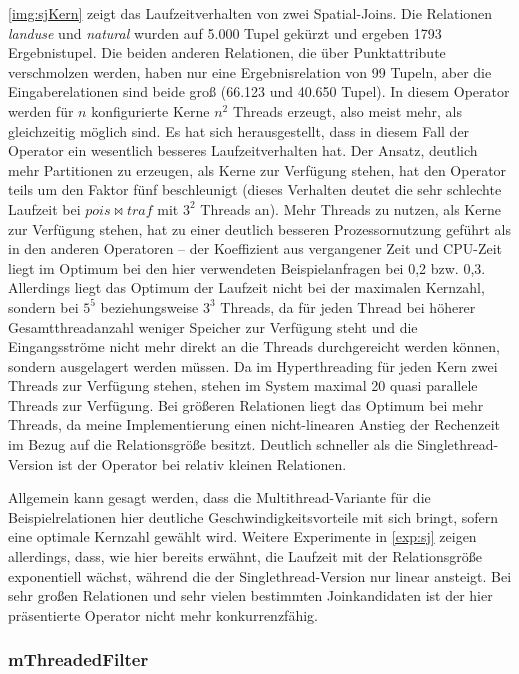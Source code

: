 \documentclass[a4paper,12pt,twoside]{article}
\newcommand{\Fb}[1]{\textit{#1}} %
\begin{document}
\autoref{img:sjKern} zeigt das Laufzeitverhalten von zwei Spatial-Joins. Die Relationen \Fb{landuse} und \Fb{natural} wurden auf 5.000 Tupel gekürzt und ergeben 1793 Ergebnistupel. Die beiden anderen Relationen, die über Punktattribute verschmolzen werden, haben nur eine Ergebnisrelation von 99 Tupeln, aber die Eingaberelationen sind beide groß (66.123 und 40.650 Tupel). In diesem Operator werden für $n$ konfigurierte Kerne $n^2$ Threads erzeugt, also meist mehr, als gleichzeitig möglich sind. Es hat sich herausgestellt, dass in diesem Fall der Operator ein wesentlich besseres Laufzeitverhalten hat. Der Ansatz, deutlich mehr Partitionen zu erzeugen, als Kerne zur Verfügung stehen, hat den Operator teils um den Faktor fünf beschleunigt (dieses Verhalten deutet die sehr schlechte Laufzeit bei $pois \bowtie traf$ mit $3^2$ Threads an). Mehr Threads zu nutzen, als Kerne zur Verfügung stehen, hat zu einer deutlich besseren Prozessornutzung geführt als in den anderen Operatoren -- der Koeffizient aus vergangener Zeit und CPU-Zeit liegt im Optimum bei den hier verwendeten Beispielanfragen bei 0,2 bzw. 0,3. Allerdings liegt das Optimum der Laufzeit nicht bei der maximalen Kernzahl, sondern bei $5^5$ beziehungsweise $3^3$ Threads, da für jeden Thread bei höherer Gesamtthreadanzahl weniger Speicher zur Verfügung steht und die Eingangsströme nicht mehr direkt an die Threads durchgereicht werden können, sondern ausgelagert werden müssen. Da im Hyperthreading für jeden Kern zwei Threads zur Verfügung stehen, stehen im System maximal 20 quasi parallele Threads zur Verfügung. Bei größeren Relationen liegt das Optimum bei mehr Threads, da meine Implementierung einen nicht-linearen Anstieg der Rechenzeit im Bezug auf die Relationsgröße besitzt. Deutlich schneller als die Singlethread-Version ist der Operator bei relativ kleinen Relationen.

Allgemein kann gesagt werden, dass die Multithread-Variante für die Beispielrelationen hier deutliche Geschwindigkeitsvorteile mit sich bringt, sofern eine optimale Kernzahl gewählt wird. Weitere Experimente in \autoref{exp:sj} zeigen allerdings, dass, wie hier bereits erwähnt, die Laufzeit mit der Relationsgröße exponentiell wächst, während die der Singlethread-Version nur linear ansteigt. Bei sehr großen Relationen und sehr vielen bestimmten Joinkandidaten ist der hier präsentierte Operator nicht mehr konkurrenzfähig.    


\subsubsection{mThreadedFilter}
\label{funk:filter}
\end{document}
